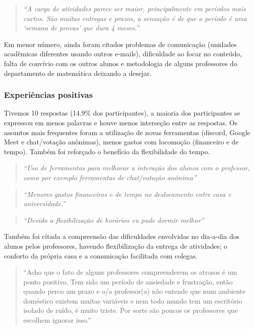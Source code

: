 \documentclass[
  12pt,
  portuguese,
]{article}
\begin{document}
\begin{quote}
\emph{``A carga de atividades parece ser maior, principalmente em
períodos mais curtos. São muitas entregas e prazos, a sensação é de que
o período é uma `semana de provas' que dura 4 meses.''}
\end{quote}

Em menor número, ainda foram citados problemas de comunicação (unidades
acadêmicas diferentes usando outros e-mails), dificuldade ao focar no
conteúdo, falta de convívio com os outros alunos e metodologia de alguns
professores do departamento de matemática deixando a desejar.

\hypertarget{experiuxeancias-positivas}{%
\subsubsection{Experiências positivas}\label{experiuxeancias-positivas}}

Tivemos 10 respostas (14.9\% dos participantes), a maioria dos
participantes se expressou em menos palavras e houve menos interseção
entre as respostas. Os assuntos mais frequentes foram a utilização de
novas ferramentas (discord, Google Meet e chat/votação anônimas), menos
gastos com locomoção (financeiro e de tempo). Também foi reforçado o
benefício da flexibilidade do tempo.

\begin{quote}
\emph{``Uso de ferramentas para melhorar a interação dos alunos com o
professor, como por exemplo ferramentas de chat/votação anônima''}
\end{quote}

\begin{quote}
\emph{``Menores gastos financeiros e de tempo no deslocamento entre casa
e universidade.''}
\end{quote}

\begin{quote}
\emph{``Devido a flexibilização de horários eu pude dormir melhor''}
\end{quote}

Também foi citada a compreensão das dificuldades envolvidas no dia-a-dia
dos alunos pelos professores, havendo flexibilização da entrega de
atividades; o conforto da própria casa e a comunicação facilitada com
colegas.

\begin{quote}
``Acho que o fato de alguns professores compreenderem os atrasos é um
ponto positivo. Tem sido um período de ansiedade e frustração, então
quando perco um prazo e o/a professor(a) não entende que num ambiente
doméstico existem muitas variáveis e nem todo mundo tem um escritório
isolado de ruído, é muito triste. Por sorte são poucos os professores
que escolhem ignorar isso.''
\end{quote}
\end{document}
